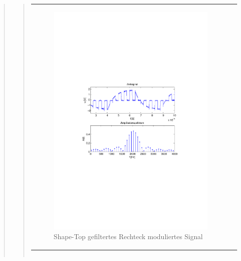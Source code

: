 \begin{quote}
\begin{quote}
\begin{center}
\begin{tabular}{ll}
                \begin{minipage}{0.6\textwidth}
                    \begin{figure}[H]
                       \includegraphics[scale=0.7, trim = 35mm 100mm 35mm 95mm, clip]{Bilder/shaperecFil20_05abget_zeit}
                       \caption{Shape-Top gefiltertes Rechteck moduliertes Signal}
		              \label{fig:shaperecFil20_05zeit}
                    \end{figure}
                \end{minipage}
            
            \end{tabular}
            \end{center}
            
            \begin{center}
            \begin{tabular}{ll}
            

\end{tabular}
\end{center}
\end{quote}
\end{quote}
